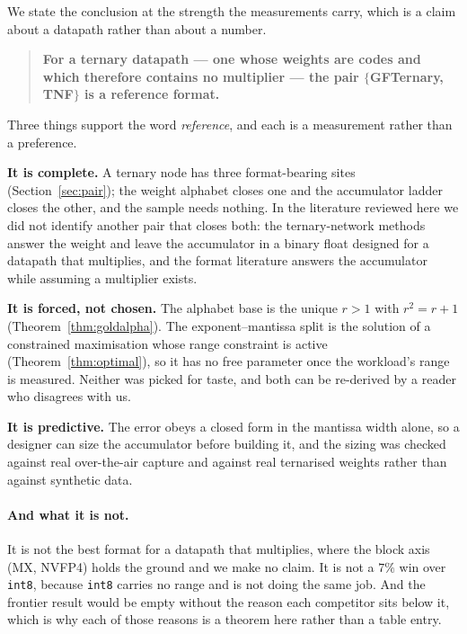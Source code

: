 \documentclass[11pt]{article}
\theoremstyle{definition}
\begin{document}
We state the conclusion at the strength the measurements carry, which is a claim
about a datapath rather than about a number.

\begin{quote}
\textbf{For a ternary datapath --- one whose weights are codes and which therefore
contains no multiplier --- the pair $\{$GFTernary, TNF$\}$ is a reference format.}
\end{quote}

Three things support the word \emph{reference}, and each is a measurement rather
than a preference.

\textbf{It is complete.} A ternary node has three format-bearing sites
(Section~\ref{sec:pair}); the weight alphabet closes one and the accumulator
ladder closes the other, and the sample needs nothing. In the literature reviewed
here we did not identify another pair that closes both: the ternary-network methods answer the weight and leave
the accumulator in a binary float designed for a datapath that multiplies, and the
format literature answers the accumulator while assuming a multiplier exists.

\textbf{It is forced, not chosen.} The alphabet base is the unique $r>1$ with
$r^2=r+1$ (Theorem~\ref{thm:goldalpha}). The exponent--mantissa split is the
solution of a constrained maximisation whose range constraint is active
(Theorem~\ref{thm:optimal}), so it has no free parameter once the workload's
range is measured. Neither was picked for taste, and both can be re-derived by a
reader who disagrees with us.

\textbf{It is predictive.} The error obeys a closed form in the mantissa width
alone, so a designer can size the accumulator before building it, and the sizing
was checked against real over-the-air capture and against real ternarised weights
rather than against synthetic data.

\paragraph{And what it is not.} It is not the best format for a datapath that
multiplies, where the block axis (MX, NVFP4) holds the ground and we make no
claim. It is not a $7\%$ win over \texttt{int8}, because \texttt{int8} carries no
range and is not doing the same job. And the frontier result would be empty
without the reason each competitor sits below it, which is why each of those
reasons is a theorem here rather than a table entry.
\end{document}

